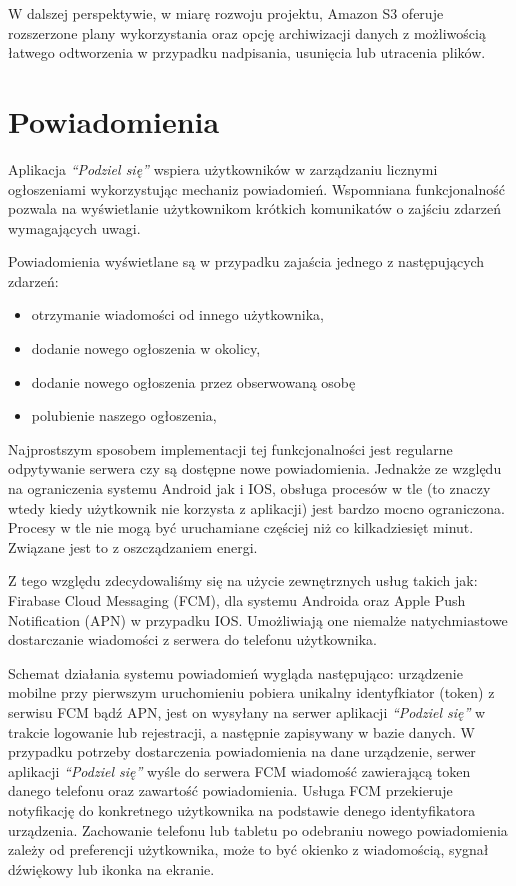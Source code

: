 \documentclass[licencjacka]{pracamgr}
\begin{document}
W dalszej perspektywie, w miarę rozwoju projektu, Amazon S3 oferuje rozszerzone plany wykorzystania oraz opcję archiwizacji danych z możliwością łatwego odtworzenia w przypadku nadpisania, usunięcia lub utracenia plików.

\section{Powiadomienia}

Aplikacja \textit{``Podziel się''} wspiera użytkowników w zarządzaniu licznymi ogłoszeniami wykorzystując mechaniz powiadomień. Wspomniana funkcjonalność pozwala na wyświetlanie użytkownikom krótkich komunikatów o zajściu zdarzeń wymagających uwagi.

Powiadomienia wyświetlane są w przypadku zajaścia jednego z następujących zdarzeń:
\begin{itemize}
\setlength\itemsep{-0.2em}
    \item otrzymanie wiadomości od innego użytkownika,
    \item dodanie nowego ogłoszenia w okolicy,
    \item dodanie nowego ogłoszenia przez obserwowaną osobę
    \item polubienie naszego ogłoszenia,
\end{itemize}{}

Najprostszym sposobem implementacji tej funkcjonalności jest regularne odpytywanie serwera czy są dostępne nowe powiadomienia. Jednakże ze względu na ograniczenia systemu Android jak i IOS, obsługa procesów w tle (to znaczy wtedy kiedy użytkownik nie korzysta z aplikacji) jest bardzo mocno ograniczona. Procesy w tle nie mogą być uruchamiane częściej niż co kilkadziesięt minut. Związane jest to z oszcządzaniem energi.

Z tego względu zdecydowaliśmy się na użycie zewnętrznych usług takich jak: Firabase Cloud Messaging (FCM), dla systemu Androida oraz Apple Push Notification (APN) w przypadku IOS. Umożliwiają one niemalże natychmiastowe dostarczanie wiadomości z serwera do telefonu użytkownika.

Schemat działania systemu powiadomień wygląda następująco: urządzenie mobilne przy pierwszym uruchomieniu pobiera unikalny identyfkiator (token) z serwisu FCM bądź APN, jest on wysyłany na serwer aplikacji \textit{``Podziel się''} w trakcie logowanie lub rejestracji, a następnie zapisywany w bazie danych. W przypadku potrzeby dostarczenia powiadomienia na dane urządzenie, serwer aplikacji \textit{``Podziel się''} wyśle do serwera FCM wiadomość zawierającą token danego telefonu oraz zawartość powiadomienia. Usługa FCM przekieruje notyfikację do konkretnego użytkownika na podstawie denego identyfikatora urządzenia. Zachowanie telefonu lub tabletu po odebraniu nowego powiadomienia zależy od preferencji użytkownika, może to być okienko z wiadomością, sygnał dźwiękowy lub ikonka na ekranie.
\end{document}
